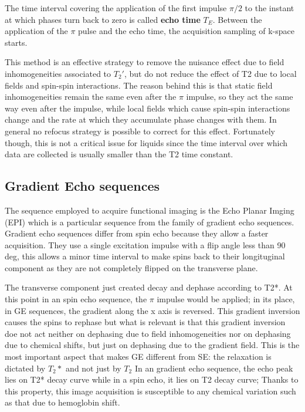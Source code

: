 \documentclass[10pt]{report}
\begin{document}
The time interval covering the application of the first impulse $\pi/2$ to the instant at which phases turn back to zero is called \textbf{echo time} $T_E$.
Between the application of the $\pi$ pulse and the echo time, the acquisition sampling of k-space starts.


This method is an effective strategy to remove the nuisance effect due to field inhomogeneities associated to $T_2'$, but do not reduce the effect of T2 due to local fields and spin-spin interactions. The reason behind this is that static field inhomogeneities remain the same even after the $\pi$ impulse, so they act the same way even after the impulse, while local fields which cause spin-spin interactions change and the rate at which they accumulate phase changes with them. In general no refocus strategy is possible to correct for this effect.
Fortunately though, this is not a critical issue for liquids since the time interval over which data are collected is usually smaller than the T2 time constant.



\subsection{Gradient Echo sequences}
The sequence employed to acquire functional imaging is the Echo Planar Imging (EPI) which is a particular sequence from the family of gradient echo sequences.
Gradient echo sequences differ from spin echo because they allow a faster acquisition.
They use a single excitation impulse with a flip angle less than 90 deg, this allows a minor time interval to make spins back to their longituginal component as they are not completely flipped on the transverse plane.

The transverse component just created decay and dephase according to T2*.
At this point in an spin echo sequence, the $\pi$ impulse would be applied; in its place, in GE sequences, the gradient along the x axis is reversed.
This gradient inversion causes the spins to rephase but what is relevant is that this gradient inversion doe not act neither on dephasing due to field inhomogeneities nor on dephasing due to chemical shifts, but just on dephasing due to the gradient field.
This is the most important aspect that makes GE different from SE: the relaxation is dictated by $T_2*$ and not just by $T_2$
In an gradient echo sequence, the echo peak lies on T2* decay curve while in a spin echo, it lies on T2 decay curve;
Thanks to this property, this image acquisition is susceptible to any chemical variation such as that due to hemoglobin shift.
\end{document}
